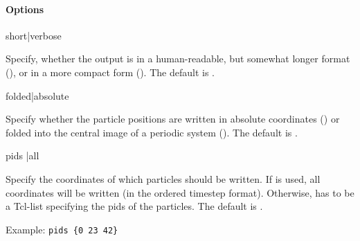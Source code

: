 \paragraph{Options}
\begin{options}
  short|verbose
\end{options}
Specify, whether the output is in a human-readable, but somewhat
longer format (), or in a more compact form
(). The default is .

\begin{options}
  folded|absolute
\end{options}
Specify whether the particle positions are written in absolute
coordinates () or folded into the central image of a
periodic system (). The default is .

\begin{options}
  pids |all
\end{options}
Specify the coordinates of which particles should be written. If
 is used, all coordinates will be written (in the ordered
timestep format). Otherwise,  has to be a Tcl-list
specifying the pids of the particles. The default is .

Example: \verb!pids {0 23 42}!







